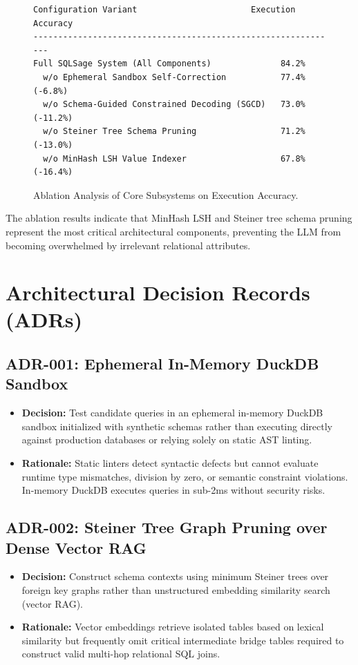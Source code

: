 \documentclass[10pt,journal,compsoc]{IEEEtran}
\begin{document}
\begin{figure}[!h]
\centering
\begin{lstlisting}
Configuration Variant                       Execution Accuracy
--------------------------------------------------------------
Full SQLSage System (All Components)              84.2%
  w/o Ephemeral Sandbox Self-Correction           77.4% (-6.8%)
  w/o Schema-Guided Constrained Decoding (SGCD)   73.0% (-11.2%)
  w/o Steiner Tree Schema Pruning                 71.2% (-13.0%)
  w/o MinHash LSH Value Indexer                   67.8% (-16.4%)
\end{lstlisting}
\caption{Ablation Analysis of Core Subsystems on Execution Accuracy.}
\label{fig:ablation}
\end{figure}

The ablation results indicate that MinHash LSH and Steiner tree schema pruning represent the most critical architectural components, preventing the LLM from becoming overwhelmed by irrelevant relational attributes.

\section{Architectural Decision Records (ADRs)}
\subsection{ADR-001: Ephemeral In-Memory DuckDB Sandbox}
\begin{itemize}
    \item \textbf{Decision:} Test candidate queries in an ephemeral in-memory DuckDB sandbox initialized with synthetic schemas rather than executing directly against production databases or relying solely on static AST linting.
    \item \textbf{Rationale:} Static linters detect syntactic defects but cannot evaluate runtime type mismatches, division by zero, or semantic constraint violations. In-memory DuckDB executes queries in sub-2ms without security risks.
\end{itemize}

\subsection{ADR-002: Steiner Tree Graph Pruning over Dense Vector RAG}
\begin{itemize}
    \item \textbf{Decision:} Construct schema contexts using minimum Steiner trees over foreign key graphs rather than unstructured embedding similarity search (vector RAG).
    \item \textbf{Rationale:} Vector embeddings retrieve isolated tables based on lexical similarity but frequently omit critical intermediate bridge tables required to construct valid multi-hop relational SQL joins.
\end{itemize}
\end{document}
